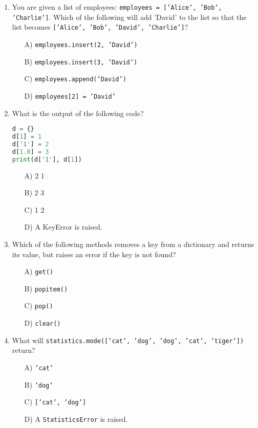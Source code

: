 \documentclass[9pt]{article}
\begin{document}
\begin{multicols}{2}
\begin{enumerate}
\item You are given a list of employees: \texttt{employees = ['Alice', 'Bob', 'Charlie']}. Which of the following will add 'David' to the list so that the list becomes \texttt{['Alice', 'Bob', 'David', 'Charlie']}?
\begin{enumerate}
    \item[A)] \texttt{employees.insert(2, 'David')}
    \item[B)] \texttt{employees.insert(3, 'David')}
    \item[C)] \texttt{employees.append('David')}
    \item[D)] \texttt{employees[2] = 'David'}
\end{enumerate}

\item What is the output of the following code?
\begin{lstlisting}[language=Python]
d = {}
d[1] = 1
d['1'] = 2
d[1.0] = 3
print(d['1'], d[1])
\end{lstlisting}
\begin{enumerate}
\item[A)] 2 1
\item[B)] 2 3
\item[C)] 1 2
\item[D)] A KeyError is raised.
\end{enumerate}

\item Which of the following methods removes a key from a dictionary and returns its value, but raises an error if the key is not found?
\begin{enumerate}
    \item[A)] \texttt{get()}
    \item[B)] \texttt{popitem()}
    \item[C)] \texttt{pop()}
    \item[D)] \texttt{clear()}
\end{enumerate}

\item What will \texttt{statistics.mode(['cat', 'dog', 'dog', 'cat', 'tiger'])} return?
\begin{enumerate}
    \item[A)] \texttt{'cat'}
    \item[B)] \texttt{'dog'}
    \item[C)] \texttt{['cat', 'dog']}
    \item[D)] A \texttt{StatisticsError} is raised.
\end{enumerate}


\end{enumerate}
\end{multicols}
\end{document}
